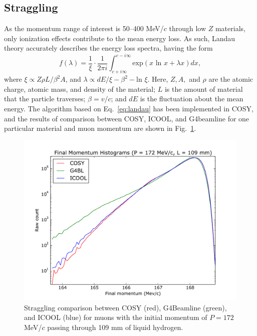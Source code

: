 \documentclass{jacow}
\begin{document}
\subsection{Straggling}
As the momentum range of interest is 50--400 MeV/$c$ through low $Z$ materials, only ionization effects contribute to the mean energy loss. As such, Landau theory accurately describes the energy loss spectra, having the form \cite{landau}
\begin{equation}
f(\lambda) = \frac{1}{\xi} \cdot \frac{1}{2\pi i} \int_{c+i \infty} ^{c-i \infty} \text{exp}(x\text{ ln } x + \lambda x) dx,
\label{eq:landau}
\end{equation}
where $\xi \propto Z\rho L/\beta^2 A$, and $\lambda \propto dE/\xi - \beta^2 - \text{ln } \xi$. Here, $Z, A,$ and $\rho$ are the atomic charge, atomic mass, and density of the material; $L$ is the amount of material that the particle traverses; $\beta=v/c$; and $dE$ is the fluctuation about the mean energy. The algorithm based on Eq.~\eqref{eq:landau} has been implemented in COSY, and the results of comparison between COSY, ICOOL, and G4beamline for one particular material and muon momentum are shown in Fig.~\ref{fig:straggling}.



\begin{figure}[htbf]
\centering
\includegraphics[width=\columnwidth]{Figures/straggling.pdf}
\caption{Straggling comparison between COSY (red), G4Beamline (green), and ICOOL (blue) for muons with the initial momentum of $P=172$ MeV/$c$ passing through 109 mm of liquid hydrogen.}
\label{fig:straggling}
\end{figure}
\end{document}
